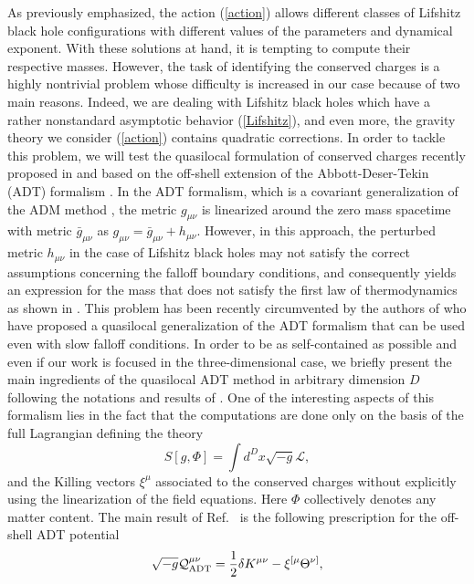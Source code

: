 \documentclass[prd,twocolumn,superscriptaddress,amsmath,amssymb,nofootinbib]{revtex4-1}
\begin{document}
As previously emphasized, the action (\ref{action}) allows
different classes of Lifshitz black hole configurations with
different values of the parameters and dynamical exponent. With
these solutions at hand, it is tempting to compute their
respective masses. However, the task of identifying the
conserved charges is a highly nontrivial problem whose
difficulty is increased in our case because of two main
reasons. Indeed, we are dealing with Lifshitz black holes which
have a rather nonstandard asymptotic behavior (\ref{Lifshitz}),
and even more, the gravity theory we consider (\ref{action})
contains quadratic corrections. In order to tackle this
problem, we will test the quasilocal formulation of conserved
charges recently proposed in \cite{Kim:2013zha,Gim:2014nba} and
based on the off-shell extension of the Abbott-Deser-Tekin (ADT) formalism
\cite{Abbott:1981ff}. In the ADT formalism, which is a covariant
generalization of the ADM method \cite{Arnowitt:1962hi}, the
metric $g_{\mu\nu}$ is linearized around the zero mass
spacetime with metric $\bar{g}_{\mu\nu}$ as
$g_{\mu\nu}=\bar{g}_{\mu\nu}+h_{\mu\nu}$. However, in this
approach, the perturbed metric $h_{\mu\nu}$ in the case of
Lifshitz black holes may not satisfy the correct assumptions
concerning the falloff boundary conditions, and consequently
yields an expression for the mass that does not satisfy the
first law of thermodynamics as shown in
\cite{Devecioglu:2010sf}. This problem has been recently
circumvented by the authors of \cite{Kim:2013zha,Gim:2014nba}
who have proposed a quasilocal generalization of the ADT
formalism that can be used even with slow falloff conditions.
In order to be as self-contained as possible and even if our
work is focused in the three-dimensional case, we briefly
present the main ingredients of the quasilocal ADT method in
arbitrary dimension $D$ following the notations and results of
\cite{Kim:2013zha,Gim:2014nba}. One of the interesting aspects
of this formalism lies in the fact that the computations are
done only on the basis of the full Lagrangian defining the
theory
$$
S[g,\Phi]={\int}d^Dx\sqrt{-g}\mathcal{L},
$$
and the Killing vectors $\xi^{\mu}$ associated to the
conserved charges without explicitly using the linearization of
the field equations. Here $\Phi$ collectively denotes any
matter content. The main result of Ref.~\cite{Kim:2013zha} is
the following prescription for the off-shell ADT potential
\begin{equation}
\sqrt{-g}{\cal Q}_{\mathrm{ADT}}^{\mu\nu}=
\frac{1}{2}\delta K^{\mu\nu}-\xi^{[\mu}\Theta^{\nu]},
\end{equation}
\end{document}
